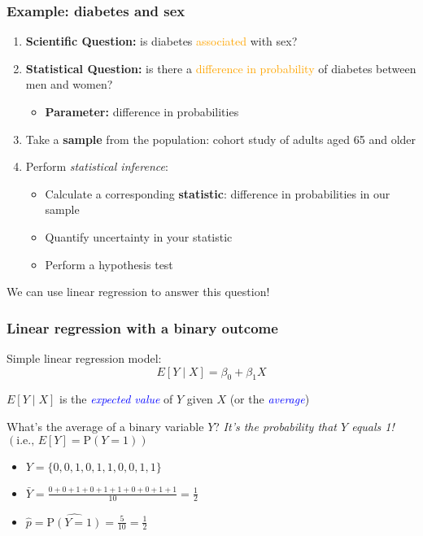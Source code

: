 \documentclass[12pt, 
hyperref={colorlinks=true, linkcolor=blue, urlcolor=cyan}]{beamer}
\begin{document}
\begin{frame}
\frametitle{Example: diabetes and sex}

\begin{enumerate}
\item \textbf{Scientific Question:} is diabetes \textcolor{orange}{associated} with sex? \pause
\item \textbf{Statistical Question:} is there a \textcolor{orange}{difference in probability} of diabetes between men and women? \pause
	\begin{itemize}
	\item \textbf{Parameter:} difference in probabilities \pause
	\end{itemize}
\item Take a \textbf{sample} from the population: cohort study of adults aged 65 and older \pause
\item Perform \textit{statistical inference}:
	\begin{itemize}
	\item Calculate a corresponding \textbf{statistic}: difference in probabilities in our sample
	\item Quantify uncertainty in your statistic
	\item Perform a hypothesis test \pause
	\end{itemize}
\end{enumerate}

We can use linear regression to answer this question!
\end{frame}

\begin{frame}
\frametitle{Linear regression with a binary outcome}

Simple linear regression model: $$E[Y \mid X] = \beta_0 + \beta_1 X$$

$E[Y \mid X]$ is the \textcolor{blue}{\textit{expected value}} of $Y$ given $X$ (or the \textcolor{blue}{\textit{average}}) \pause

What's the average of a binary variable $Y$? \pause \textit{It's the probability that $Y$ equals 1!} $\left(\text{i.e., } E[Y] = \text{P}(Y=1)\right)$ \pause

\begin{itemize} \itemsep +12pt
\item[] $Y = \{ 0, 0, 1, 0, 1, 1, 0, 0, 1, 1 \}$ \pause
\item[] $\bar{Y} = \frac{0 + 0 + 1 + 0 + 1 + 1 + 0 + 0 + 1 + 1}{10} = \frac{1}{2}$ \pause
\item[] $\hat{p} = \widehat{\text{P}(Y=1)} = \frac{5}{10} = \frac{1}{2} $
\end{itemize}
\end{frame}
\end{document}

